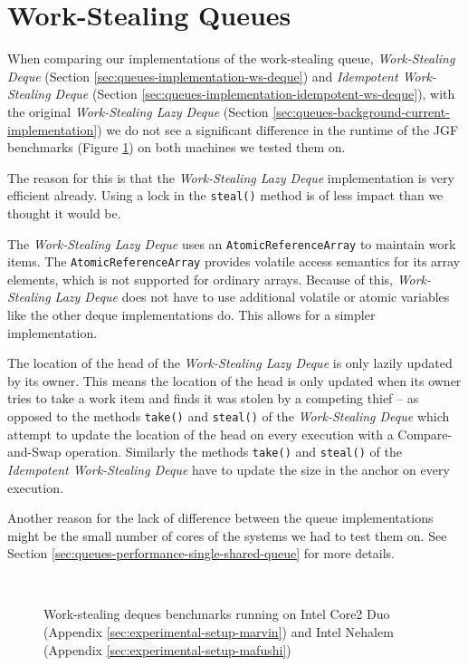\section{Work-Stealing Queues}
\label{sec:queues-performance-ws}

When comparing our implementations of the work-stealing queue,
\emph{Work-Stealing Deque} (Section
\ref{sec:queues-implementation-ws-deque}) and \emph{Idempotent
  Work-Stealing Deque} (Section
\ref{sec:queues-implementation-idempotent-ws-deque}), with the
original \emph{Work-Stealing Lazy Deque} (Section
\ref{sec:queues-background-current-implementation}) we do not see a
significant difference in the runtime of the JGF benchmarks (Figure
\ref{fig:queues-performance-deques}) on both machines we tested them
on.

The reason for this is that the \emph{Work-Stealing Lazy Deque}
implementation is very efficient already. Using a lock in the
\lstinline!steal()! method is of less impact than we thought it would
be.

The \emph{Work-Stealing Lazy Deque} uses an
\lstinline!AtomicReferenceArray! to maintain work items. The
\lstinline!AtomicReferenceArray! provides volatile access semantics
for its array elements, which is not supported for ordinary
arrays. Because of this, \emph{Work-Stealing Lazy Deque} does not have
to use additional volatile or atomic variables like the other deque
implementations do. This allows for a simpler implementation.

The location of the head of the \emph{Work-Stealing Lazy Deque} is
only lazily updated by its owner. This means the location of the head
is only updated when its owner tries to take a work item and finds it
was stolen by a competing thief -- as opposed to the methods
\lstinline!take()! and \lstinline!steal()!  of the \emph{Work-Stealing
  Deque} which attempt to update the location of the head on every
execution with a Compare-and-Swap operation. Similarly the methods
\lstinline!take()!  and \lstinline!steal()! of the \emph{Idempotent
  Work-Stealing Deque} have to update the size in the anchor on every
execution.

Another reason for the lack of difference between the queue
implementations might be the small number of cores of the systems we
had to test them on. See Section
\ref{sec:queues-performance-single-shared-queue} for more details.

\begin{figure}[!ht]
  \centering
  \\
  \caption[Work-stealing deques benchmarks]{Work-stealing deques
    benchmarks running on Intel Core2 Duo (Appendix
    \ref{sec:experimental-setup-marvin}) and Intel Nehalem (Appendix
    \ref{sec:experimental-setup-mafushi})}
  \label{fig:queues-performance-deques}
\end{figure}


